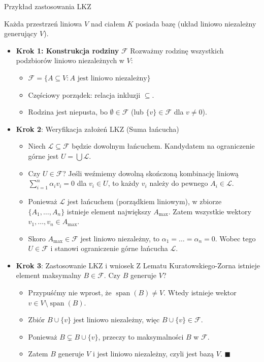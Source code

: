 \documentclass[aspectratio=169,11pt,t,envcountsect,professionalfonts]{beamer}
\begin{document}
\begin{frame}[allowframebreaks]{Przykład zastosowania LKZ}

\begin{mythm}
    Każda przestrzeń liniowa $V$ nad ciałem $K$ posiada bazę (układ liniowo niezależny generujący $V$).
\end{mythm}
\begin{itemize}
    \item \textbf{Krok 1: Konstrukcja rodziny} $\mathcal{F}$
  Rozważmy rodzinę wszystkich podzbiorów liniowo niezależnych w $V$:
      \begin{itemize}
          \item $\mathcal{F} = \{ A \subseteq V : A \text{ jest liniowo niezależny} \}$
          \item Częściowy porządek: relacja inkluzji $\subseteq$.
          \item Rodzina jest niepusta, bo $\emptyset \in \mathcal{F}$ (lub $\{v\} \in \mathcal{F}$ dla $v \neq 0$).
      \end{itemize}

    \item \textbf{Krok 2}: Weryfikacja założeń LKZ (Suma łańcucha)
    \begin{itemize}
        \item Niech $\mathcal{L} \subseteq \mathcal{F}$ będzie dowolnym łańcuchem. Kandydatem na ograniczenie górne jest $U = \bigcup \mathcal{L}$.
        \item Czy $U \in \mathcal{F}$? Jeśli weźmiemy dowolną skończoną kombinację liniową $\sum_{i=1}^n \alpha_i v_i = 0$ dla $v_i \in U$, to każdy $v_i$ należy do pewnego $A_i \in \mathcal{L}$.
        \item Ponieważ $\mathcal{L}$ jest łańcuchem (porządkiem liniowym), w zbiorze $\{A_1, \dots, A_n\}$ istnieje element największy $A_{\max}$. Zatem wszystkie wektory $v_1, \dots, v_n \in A_{\max}$.
        \item Skoro $A_{\max} \in \mathcal{F}$ jest liniowo niezależny, to $\alpha_1 = \dots = \alpha_n = 0$. Wobec tego $U \in \mathcal{F}$ i stanowi ograniczenie górne łańcucha $\mathcal{L}$.
    \end{itemize}

    \item \textbf{Krok 3}: Zastosowanie LKZ i wniosek
        Z Lematu Kuratowskiego-Zorna istnieje element maksymalny $B \in \mathcal{F}$.
        Czy $B$ generuje $V$?
        \begin{itemize}
            \item   Przypuśćmy nie wprost, że $\operatorname{span}(B) \neq V$. Wtedy istnieje wektor $v \in V \setminus \operatorname{span}(B)$.
            \item Zbiór $B \cup \{v\}$ jest liniowo niezależny, więc $B \cup \{v\} \in \mathcal{F}$.
            \item Ponieważ $B \subsetneq B \cup \{v\}$, przeczy to maksymalności $B$ w $\mathcal{F}$.
            \item Zatem $B$ generuje $V$ i jest liniowo niezależny, czyli jest bazą $V$. $\blacksquare$
        \end{itemize}
    \end{itemize}
\end{frame}
\end{document}
